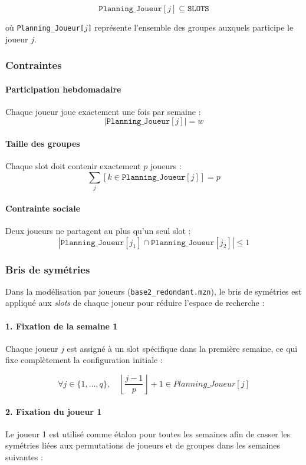 \documentclass{article}
\begin{document}
\[
\texttt{Planning\_Joueur}[j] \subseteq \texttt{SLOTS}
\]

où \texttt{Planning\_Joueur[$j$]} représente l’ensemble des groupes auxquels participe le joueur $j$.

\subsubsection{Contraintes}

\paragraph{Participation hebdomadaire}
Chaque joueur joue exactement une fois par semaine :
\[
|\texttt{Planning\_Joueur}[j]| = w
\]

\paragraph{Taille des groupes}
Chaque slot doit contenir exactement $p$ joueurs :
\[
\sum_j [k \in \texttt{Planning\_Joueur}[j]] = p
\]

\paragraph{Contrainte sociale}
Deux joueurs ne partagent au plus qu’un seul slot :
\[
|\texttt{Planning\_Joueur}[j_1] \cap \texttt{Planning\_Joueur}[j_2]| \leq 1
\]

\subsubsection{Bris de symétries}

Dans la modélisation par joueurs (\texttt{base2\_redondant.mzn}), le bris de symétries est appliqué aux \emph{slots} de chaque joueur pour réduire l’espace de recherche :

\paragraph{1. Fixation de la semaine 1}
Chaque joueur $j$ est assigné à un slot spécifique dans la première semaine, ce qui fixe complètement la configuration initiale :

\[
\forall j \in \{1, \dots, q\}, \quad \left\lfloor \frac{j-1}{p} \right\rfloor + 1 \in Planning\_Joueur[j]
\]

\paragraph{2. Fixation du joueur 1}
Le joueur 1 est utilisé comme étalon pour toutes les semaines afin de casser les symétries liées aux permutations de joueurs et de groupes dans les semaines suivantes :
\end{document}
